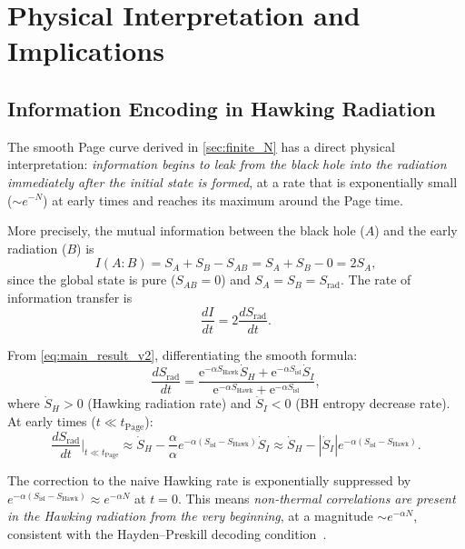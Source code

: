 \documentclass[12pt,a4paper]{article}
\newcommand{\Srad}{S_{\mathrm{rad}}}
\newcommand{\SHawk}{S_{\mathrm{Hawk}}}
\newcommand{\Sisl}{S_{\mathrm{isl}}}
\newcommand{\tPage}{t_{\mathrm{Page}}}
\newcommand{\e}{\mathrm{e}}
\begin{document}
\section{Physical Interpretation and Implications}
\label{sec:discussion}

\subsection{Information Encoding in Hawking Radiation}
\label{subsec:information_encoding}

The smooth Page curve derived in \cref{sec:finite_N} has a direct
physical interpretation: \emph{information begins to leak from the black
hole into the radiation immediately after the initial state is formed}, at
a rate that is exponentially small ($\sim e^{-N}$) at early times and
reaches its maximum around the Page time.

More precisely, the mutual information between the black hole ($A$) and the
early radiation ($B$) is
\begin{equation}
  I(A:B) = S_A + S_B - S_{AB}
    = S_A + S_B - 0 = 2S_A,
\label{eq:mutual_information}
\end{equation}
since the global state is pure ($S_{AB} = 0$) and $S_A = S_B = \Srad$.
The rate of information transfer is
\begin{equation}
  \frac{dI}{dt} = 2\frac{d\Srad}{dt}.
\label{eq:info_rate}
\end{equation}

From \cref{eq:main_result_v2}, differentiating the smooth formula:
\begin{equation}
  \frac{d\Srad}{dt} = \frac{\e^{-\alpha\SHawk}\dot{S}_H
    + \e^{-\alpha\Sisl}\dot{S}_I}
    {\e^{-\alpha\SHawk} + \e^{-\alpha\Sisl}},
\label{eq:info_rate_explicit}
\end{equation}
where $\dot{S}_H > 0$ (Hawking radiation rate) and $\dot{S}_I < 0$ (BH
entropy decrease rate).  At early times ($t \ll \tPage$):
\begin{equation}
  \frac{d\Srad}{dt}\bigg|_{t\ll\tPage}
    \approx \dot{S}_H - \frac{\alpha}{\alpha} e^{-\alpha(\Sisl - \SHawk)}\dot{S}_I
    \approx \dot{S}_H - |\dot{S}_I|e^{-\alpha(\Sisl - \SHawk)}.
\label{eq:early_rate}
\end{equation}

The correction to the naive Hawking rate is exponentially suppressed by
$e^{-\alpha(\Sisl - \SHawk)} \approx e^{-\alpha N}$ at $t = 0$.  This means
\emph{non-thermal correlations are present in the Hawking radiation from the
very beginning}, at a magnitude $\sim e^{-\alpha N}$, consistent with the
Hayden--Preskill decoding condition~\citep{Hayden2007}.
\end{document}
